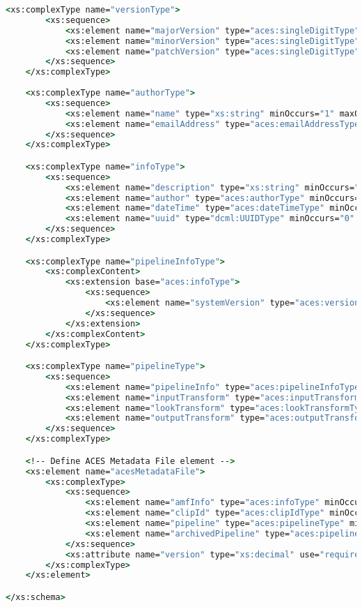 \begin{lstlisting}[language=csh]
	<xs:complexType name="versionType">
		<xs:sequence>
			<xs:element name="majorVersion" type="aces:singleDigitType" minOccurs="1" maxOccurs="1"/>
			<xs:element name="minorVersion" type="aces:singleDigitType" minOccurs="1" maxOccurs="1"/>
			<xs:element name="patchVersion" type="aces:singleDigitType" minOccurs="1" maxOccurs="1"/>
		</xs:sequence>
	</xs:complexType>
	
	<xs:complexType name="authorType">
		<xs:sequence>
			<xs:element name="name" type="xs:string" minOccurs="1" maxOccurs="1"/>
			<xs:element name="emailAddress" type="aces:emailAddressType" minOccurs="1" maxOccurs="1"/>
		</xs:sequence>
	</xs:complexType>

	<xs:complexType name="infoType">
		<xs:sequence>
			<xs:element name="description" type="xs:string" minOccurs="0" maxOccurs="1"/>
			<xs:element name="author" type="aces:authorType" minOccurs="0" maxOccurs="unbounded"/>
			<xs:element name="dateTime" type="aces:dateTimeType" minOccurs="1" maxOccurs="1"/>
			<xs:element name="uuid" type="dcml:UUIDType" minOccurs="0" maxOccurs="1"/>
		</xs:sequence>
	</xs:complexType>

	<xs:complexType name="pipelineInfoType">
		<xs:complexContent>
			<xs:extension base="aces:infoType">
				<xs:sequence>
					<xs:element name="systemVersion" type="aces:versionType" minOccurs="1" maxOccurs="1"/>
				</xs:sequence>
			</xs:extension>
		</xs:complexContent>
	</xs:complexType>

	<xs:complexType name="pipelineType">
		<xs:sequence>
			<xs:element name="pipelineInfo" type="aces:pipelineInfoType" minOccurs="1" maxOccurs="1"/>
			<xs:element name="inputTransform" type="aces:inputTransformType" minOccurs="0" maxOccurs="1"/>
			<xs:element name="lookTransform" type="aces:lookTransformType" minOccurs="0" maxOccurs="unbounded" />
			<xs:element name="outputTransform" type="aces:outputTransformType" minOccurs="1" maxOccurs="1"/>
		</xs:sequence>
	</xs:complexType>

	<!-- Define ACES Metadata File element -->
	<xs:element name="acesMetadataFile">
		<xs:complexType>
			<xs:sequence>
				<xs:element name="amfInfo" type="aces:infoType" minOccurs="1" maxOccurs="1"/>
				<xs:element name="clipId" type="aces:clipIdType" minOccurs="0" maxOccurs="1"/>
				<xs:element name="pipeline" type="aces:pipelineType" minOccurs="1" maxOccurs="1"/>
				<xs:element name="archivedPipeline" type="aces:pipelineType" minOccurs="0" maxOccurs="unbounded"/>
			</xs:sequence>
			<xs:attribute name="version" type="xs:decimal" use="required" fixed="1.0"/>
		</xs:complexType>
	</xs:element>

</xs:schema>

\end{lstlisting}
